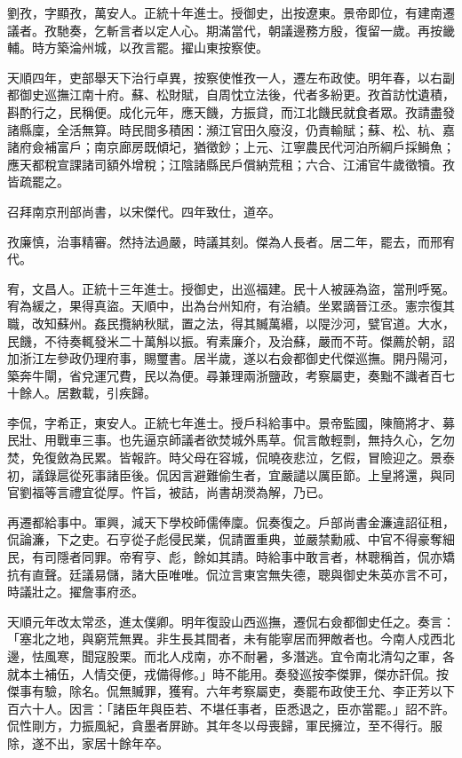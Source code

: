 \begin{pinyinscope}
劉孜，字顯孜，萬安人。正統十年進士。授御史，出按遼東。景帝即位，有建南遷議者。孜馳奏，乞斬言者以定人心。期滿當代，朝議邊務方殷，復留一歲。再按畿輔。時方築淪州城，以孜言罷。擢山東按察使。

天順四年，吏部舉天下治行卓異，按察使惟孜一人，遷左布政使。明年春，以右副都御史巡撫江南十府。蘇、松財賦，自周忱立法後，代者多紛更。孜首訪忱遺積，斟酌行之，民稱便。成化元年，應天饑，方振貸，而江北饑民就食者眾。孜請盡發諸縣廩，全活無算。時民間多積困：瀕江官田久廢沒，仍責輸賦；蘇、松、杭、嘉諸府僉補富戶；南京廊房既傾圮，猶徵鈔；上元、江寧農民代河泊所綱戶採鰣魚；應天都稅宣課諸司額外增稅；江陰諸縣民戶償納荒租；六合、江浦官牛歲徵犢。孜皆疏罷之。

召拜南京刑部尚書，以宋傑代。四年致仕，道卒。

孜廉慎，治事精審。然持法過嚴，時議其刻。傑為人長者。居二年，罷去，而邢宥代。

宥，文昌人。正統十三年進士。授御史，出巡福建。民十人被誣為盜，當刑呼冤。宥為緩之，果得真盜。天順中，出為台州知府，有治績。坐累謫晉江丞。憲宗復其職，改知蘇州。姦民攬納秋賦，置之法，得其贓萬緡，以隄沙河，甓官道。大水，民饑，不待奏輒發米二十萬斛以振。宥素廉介，及治蘇，嚴而不苛。傑薦於朝，詔加浙江左參政仍理府事，賜璽書。居半歲，遂以右僉都御史代傑巡撫。開丹陽河，築奔牛閘，省兌運冗費，民以為便。尋兼理兩浙鹽政，考察屬吏，奏黜不識者百七十餘人。居數載，引疾歸。

李侃，字希正，東安人。正統七年進士。授戶科給事中。景帝監國，陳簡將才、募民壯、用戰車三事。也先逼京師議者欲焚城外馬草。侃言敵輕剽，無持久心，乞勿焚，免復斂為民累。皆報許。時父母在容城，侃曉夜悲泣，乞假，冒險迎之。景泰初，議錄扈從死事諸臣後。侃因言避難偷生者，宜嚴譴以厲臣節。上皇將還，與同官劉福等言禮宜從厚。忤旨，被詰，尚書胡濙為解，乃已。

再遷都給事中。軍興，減天下學校師儒俸廩。侃奏復之。戶部尚書金濂違詔征租，侃論濂，下之吏。石亨從子彪侵民業，侃請置重典，並嚴禁勳戚、中官不得豪奪細民，有司隱者同罪。帝宥亨、彪，餘如其請。時給事中敢言者，林聰稱首，侃亦矯抗有直聲。廷議易儲，諸大臣唯唯。侃泣言東宮無失德，聰與御史朱英亦言不可，時議壯之。擢詹事府丞。

天順元年改太常丞，進太僕卿。明年復設山西巡撫，遷侃右僉都御史任之。奏言：「塞北之地，與窮荒無異。非生長其間者，未有能寧居而狎敵者也。今南人戍西北邊，怯風寒，聞寇股栗。而北人戍南，亦不耐暑，多潛逃。宜令南北清勾之軍，各就本土補伍，人情交便，戎備得修。」時不能用。奏發巡按李傑罪，傑亦訐侃。按傑事有驗，除名。侃無贓罪，獲宥。六年考察屬吏，奏罷布政使王允、李正芳以下百六十人。因言：「諸臣年與臣若、不堪任事者，臣悉退之，臣亦當罷。」詔不許。侃性剛方，力振風紀，貪墨者屏跡。其年冬以母喪歸，軍民擁泣，至不得行。服除，遂不出，家居十餘年卒。


\end{pinyinscope}
